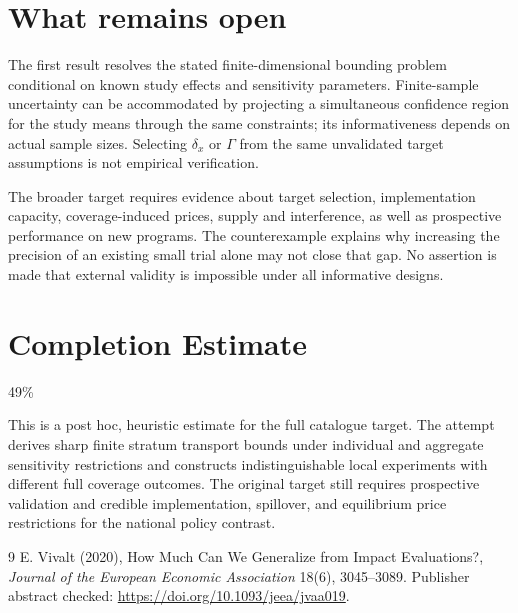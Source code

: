 \documentclass[11pt]{article}
\begin{document}
\section*{What remains open}
The first result resolves the stated finite-dimensional bounding problem conditional on known study effects and sensitivity parameters. Finite-sample uncertainty can be accommodated by projecting a simultaneous confidence region for the study means through the same constraints; its informativeness depends on actual sample sizes. Selecting $\delta_x$ or $\Gamma$ from the same unvalidated target assumptions is not empirical verification.

The broader target requires evidence about target selection, implementation capacity, coverage-induced prices, supply and interference, as well as prospective performance on new programs. The counterexample explains why increasing the precision of an existing small trial alone may not close that gap. No assertion is made that external validity is impossible under all informative designs.

\section{Completion Estimate}
49\%

This is a post hoc, heuristic estimate for the full catalogue target.
The attempt derives sharp finite stratum transport bounds under individual and aggregate sensitivity restrictions and constructs indistinguishable local experiments with different full coverage outcomes. The original target still requires prospective validation and credible implementation, spillover, and equilibrium price restrictions for the national policy contrast.

\begin{thebibliography}{9}
 E. Vivalt (2020), How Much Can We Generalize from Impact Evaluations?, \emph{Journal of the European Economic Association} 18(6), 3045--3089. Publisher abstract checked:
\url{https://doi.org/10.1093/jeea/jvaa019}.
\end{thebibliography}
\end{document}
